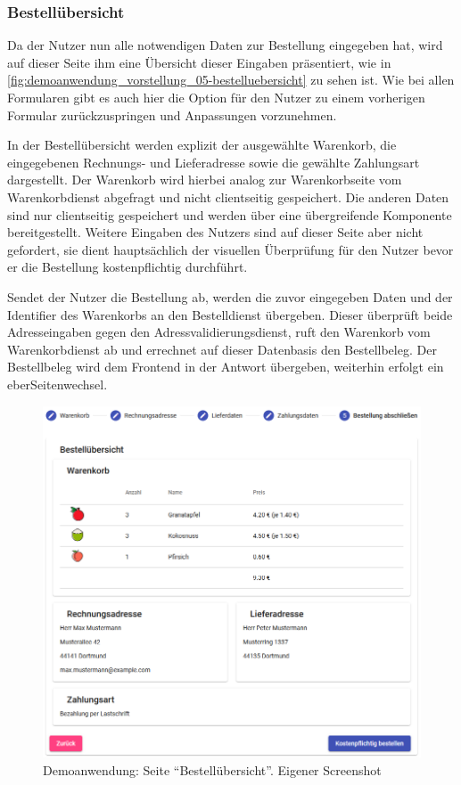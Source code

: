 \subsubsection{Bestellübersicht}

Da der Nutzer nun alle notwendigen Daten zur Bestellung eingegeben hat, wird auf dieser Seite ihm eine Übersicht dieser Eingaben präsentiert, wie in \autoref{fig:demoanwendung_vorstellung_05-bestelluebersicht} zu sehen ist. Wie bei allen Formularen gibt es auch hier die Option für den Nutzer zu einem vorherigen Formular zurückzuspringen und Anpassungen vorzunehmen.

In der Bestellübersicht werden explizit der ausgewählte Warenkorb, die eingegebenen Rechnungs- und Lieferadresse sowie die gewählte Zahlungsart dargestellt. Der Warenkorb wird hierbei analog zur Warenkorbseite vom Warenkorbdienst abgefragt und nicht clientseitig gespeichert. Die anderen Daten sind nur clientseitig gespeichert und werden über eine übergreifende Komponente bereitgestellt. Weitere Eingaben des Nutzers sind auf dieser Seite aber nicht gefordert, sie dient hauptsächlich der visuellen Überprüfung für den Nutzer bevor er die Bestellung kostenpflichtig durchführt.

Sendet der Nutzer die Bestellung ab, werden die zuvor eingegeben Daten und der Identifier des Warenkorbs an den Bestelldienst übergeben. Dieser überprüft beide Adresseingaben gegen den Adressvalidierungsdienst, ruft den Warenkorb vom Warenkorbdienst ab und errechnet auf dieser Datenbasis den Bestellbeleg. Der Bestellbeleg wird dem Frontend in der Antwort übergeben, weiterhin erfolgt ein eberSeitenwechsel.

\begin{figure}[H]
	\centering
	\includegraphics[width=0.68\linewidth]{img/04_erstellung-poc/demoanwendung_vorstellung_05-bestelluebersicht_cropped}
	\caption{Demoanwendung: Seite \enquote{Bestellübersicht}. Eigener Screenshot}
	\label{fig:demoanwendung_vorstellung_05-bestelluebersicht}
\end{figure}

